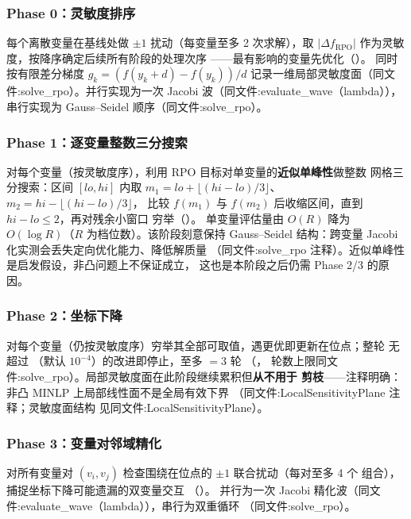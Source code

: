 \subsubsection*{Phase 0：灵敏度排序}
每个离散变量在基线处做 $\pm1$ 扰动（每变量至多 2 次求解），取
$|\Delta f_{\mathrm{RPO}}|$ 作为灵敏度，按降序确定后续所有阶段的处理次序
——最有影响的变量先优化（）。
同时按有限差分梯度
$g_k=(f(y_k+d)-f(y_k))/d$ 记录一维局部灵敏度面（同文件:solve\_rpo）。并行实现为一次 Jacobi 波（同文件:evaluate\_wave（lambda）），串行实现为
Gauss--Seidel 顺序（同文件:solve\_rpo）。

\subsubsection*{Phase 1：逐变量整数三分搜索}
对每个变量（按灵敏度序），利用 RPO 目标对单变量的\textbf{近似单峰性}做整数
网格三分搜索：区间 $[lo,hi]$ 内取
$m_1=lo+\lfloor(hi-lo)/3\rfloor$、$m_2=hi-\lfloor(hi-lo)/3\rfloor$，
比较 $f(m_1)$ 与 $f(m_2)$ 后收缩区间，直到 $hi-lo\le 2$，再对残余小窗口
穷举（）。
单变量评估量由 $O(R)$ 降为 $O(\log R)$（$R$ 为档位数）。该阶段刻意保持
Gauss--Seidel 结构：跨变量 Jacobi 化实测会丢失定向优化能力、降低解质量
（同文件:solve\_rpo 注释）。近似单峰性是启发假设，非凸问题上不保证成立，
这也是本阶段之后仍需 Phase 2/3 的原因。

\subsubsection*{Phase 2：坐标下降}
对每个变量（仍按灵敏度序）穷举其全部可取值，遇更优即更新在位点；整轮
无超过 （默认 $10^{-4}$）的改进即停止，至多
${}=3$ 轮
（，
轮数上限同文件:solve\_rpo）。局部灵敏度面在此阶段继续累积但\textbf{从不用于
剪枝}——注释明确：非凸 MINLP 上局部线性面不是全局有效下界
（同文件:LocalSensitivityPlane 注释；灵敏度面结构
 见同文件:LocalSensitivityPlane）。

\subsubsection*{Phase 3：变量对邻域精化}
对所有变量对 $(v_i,v_j)$ 检查围绕在位点的 $\pm1$ 联合扰动（每对至多 4 个
组合），捕捉坐标下降可能遗漏的双变量交互
（）。
并行为一次 Jacobi 精化波（同文件:evaluate\_wave（lambda）），串行为双重循环
（同文件:solve\_rpo）。

